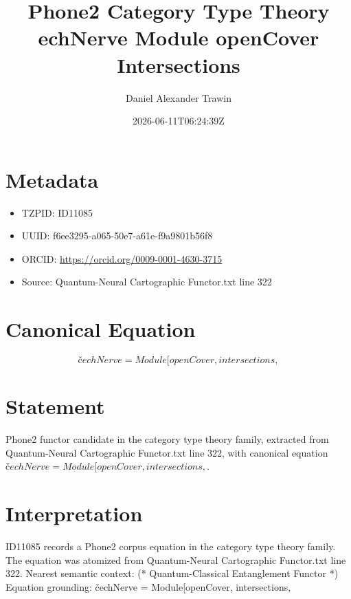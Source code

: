 \documentclass[11pt]{article}
\title{Phone2 Category Type Theory echNerve Module openCover Intersections}
\author{Daniel Alexander Trawin}
\date{2026-06-11T06:24:39Z}
\begin{document}
\maketitle
\section*{Metadata}
\begin{itemize}
\item TZPID: ID11085
\item UUID: f6ee3295-a065-50e7-a61e-f9a9801b56f8
\item ORCID: \url{https://orcid.org/0009-0001-4630-3715}
\item Source: Quantum-Neural Cartographic Functor.txt line 322
\end{itemize}
\section*{Canonical Equation}
\[
čechNerve = Module[{openCover, intersections},
\]
\section*{Statement}
Phone2 functor candidate in the category type theory family, extracted from Quantum-Neural Cartographic Functor.txt line 322, with canonical equation $čechNerve = Module[{openCover, intersections},$.
\section*{Interpretation}
ID11085 records a Phone2 corpus equation in the category type theory family. The equation was atomized from Quantum-Neural Cartographic Functor.txt line 322. Nearest semantic context: (* Quantum-Classical Entanglement Functor *) Equation grounding: čechNerve = Module[{openCover, intersections},
\end{document}
